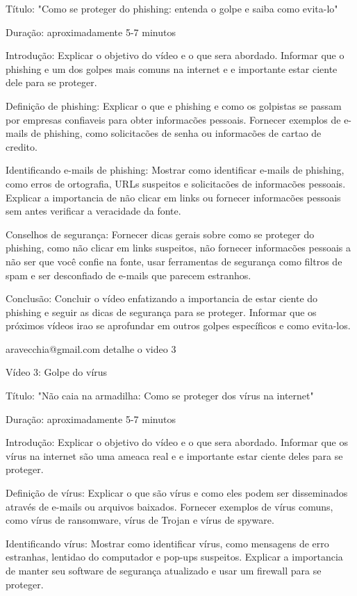Título: "Como se proteger do phishing: entenda o golpe e saiba como evita-lo"

Duração: aproximadamente 5-7 minutos

Introdução: Explicar o objetivo do vídeo e o que sera abordado. Informar que o phishing e um dos golpes mais comuns na internet e e importante estar ciente dele para se proteger.

Definição de phishing: Explicar o que e phishing e como os golpistas se passam por empresas confiaveis para obter informacões pessoais. Fornecer exemplos de e-mails de phishing, como solicitacões de senha ou informacões de cartao de credito.

Identificando e-mails de phishing: Mostrar como identificar e-mails de phishing, como erros de ortografia, URLs suspeitos e solicitacões de informacões pessoais. Explicar a importancia de não clicar em links ou fornecer informacões pessoais sem antes verificar a veracidade da fonte.

Conselhos de segurança: Fornecer dicas gerais sobre como se proteger do phishing, como não clicar em links suspeitos, não fornecer informacões pessoais a não ser que você confie na fonte, usar ferramentas de segurança como filtros de spam e ser desconfiado de e-mails que parecem estranhos.

Conclusão: Concluir o vídeo enfatizando a importancia de estar ciente do phishing e seguir as dicas de segurança para se proteger. Informar que os próximos vídeos irao se aprofundar em outros golpes específicos e como evita-los.

aravecchia@gmail.com
detalhe o video 3

Vídeo 3: Golpe do vírus

Título: "Não caia na armadilha: Como se proteger dos vírus na internet"

Duração: aproximadamente 5-7 minutos

Introdução: Explicar o objetivo do vídeo e o que sera abordado. Informar que os vírus na internet são uma ameaca real e e importante estar ciente deles para se proteger.

Definição de vírus: Explicar o que são vírus e como eles podem ser disseminados através de e-mails ou arquivos baixados. Fornecer exemplos de vírus comuns, como vírus de ransomware, vírus de Trojan e vírus de spyware.

Identificando vírus: Mostrar como identificar vírus, como mensagens de erro estranhas, lentidao do computador e pop-ups suspeitos. Explicar a importancia de manter seu software de segurança atualizado e usar um firewall para se proteger.

